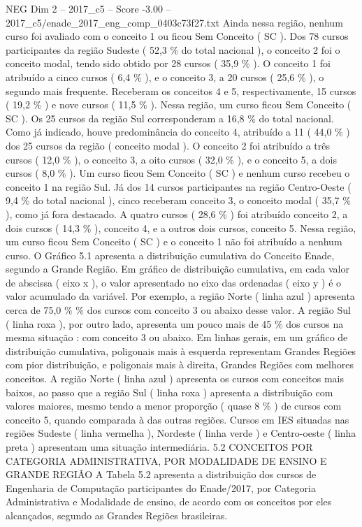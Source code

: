 \begin{textsample}{NEG Dim 2 – 2017\_c5 – Score -3.00 – 2017\_c5/enade\_2017\_eng\_comp\_0403c73f27.txt}
Ainda nessa região, nenhum curso foi avaliado com o conceito 1 ou ficou Sem Conceito ( SC ).
Dos 78 cursos participantes da região Sudeste ( 52,3 \% do total nacional ), o conceito 2 foi o conceito modal, tendo sido obtido por 28 cursos ( 35,9 \% ).
O conceito 1 foi atribuído a cinco cursos ( 6,4 \% ), e o conceito 3, a 20 cursos ( 25,6 \% ), o segundo mais frequente.
Receberam os conceitos 4 e 5, respectivamente, 15 cursos ( 19,2 \% ) e nove cursos ( 11,5 \% ).
Nessa região, um curso ficou Sem Conceito ( SC ).
Os 25 cursos da região Sul corresponderam a 16,8 \% do total nacional.
Como já indicado, houve predominância do conceito 4, atribuído a 11 ( 44,0 \% ) dos 25 cursos da região ( conceito modal ).
O conceito 2 foi atribuído a três cursos ( 12,0 \% ), o conceito 3, a oito cursos ( 32,0 \% ), e o conceito 5, a dois cursos ( 8,0 \% ).
Um curso ficou Sem Conceito ( SC ) e nenhum curso recebeu o conceito 1 na região Sul.
Já dos 14 cursos participantes na região Centro-Oeste ( 9,4 \% do total nacional ), cinco receberam conceito 3, o conceito modal ( 35,7 \% ), como já fora destacado.
A quatro cursos ( 28,6 \% ) foi atribuído conceito 2, a dois cursos ( 14,3 \% ), conceito 4, e a outros dois cursos, conceito 5.
Nessa região, um curso ficou Sem Conceito ( SC ) e o conceito 1 não foi atribuído a nenhum curso.
O Gráfico 5.1 apresenta a distribuição cumulativa do Conceito Enade, segundo a Grande Região.
Em gráfico de distribuição cumulativa, em cada valor de abscissa ( eixo x ), o valor apresentado no eixo das ordenadas ( eixo y ) é o valor acumulado da variável.
Por exemplo, a região Norte ( linha azul ) apresenta cerca de 75,0 \% \% dos cursos com conceito 3 ou abaixo desse valor.
A região Sul ( linha roxa ), por outro lado, apresenta um pouco mais de 45 \% dos cursos na mesma situação : com conceito 3 ou abaixo.
Em linhas gerais, em um gráfico de distribuição cumulativa, poligonais mais à esquerda representam Grandes Regiões com pior distribuição, e poligonais mais à direita, Grandes Regiões com melhores conceitos.
A região Norte ( linha azul ) apresenta os cursos com conceitos mais baixos, ao passo que a região Sul ( linha roxa ) apresenta a distribuição com valores maiores, mesmo tendo a menor proporção ( quase 8 \% ) de cursos com conceito 5, quando comparada à das outras regiões.
Cursos em IES situadas nas regiões Sudeste ( linha vermelha ), Nordeste ( linha verde ) e Centro-oeste ( linha preta ) apresentam uma situação intermediária. 5.2 CONCEITOS POR CATEGORIA ADMINISTRATIVA, POR MODALIDADE DE ENSINO E GRANDE REGIÃO A Tabela 5.2 apresenta a distribuição dos cursos de Engenharia de Computação participantes do Enade/2017, por Categoria Administrativa e Modalidade de ensino, de acordo com os conceitos por eles alcançados, segundo as Grandes Regiões brasileiras.

\end{textsample}
